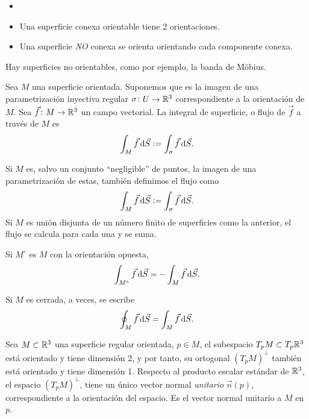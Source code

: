 \begin{obs}
    \begin{itemize}
        \item[]
        \item Una superficie conexa orientable tiene 2 orientaciones.
        \item Una superficie \emph{NO} conexa se orienta orientando cada componente conexa.
    \end{itemize}
\end{obs}
\begin{obs}
    Hay superficies no orientables, como por ejemplo, la banda de Möbius.
\end{obs}

\begin{defi}
    Sea $M$ una superficie orientada. Suponemos que es la imagen de una parametrización inyectiva regular $\sigma \colon U \to \mathbb{R}^3$
    correspondiente a la orientación de $M$. Sea $\vec{f} \colon M \to \mathbb{R}^3$ un campo vectorial. La integral de superficie, o flujo de $\vec{f}$
    a trav\'es de $M$ es
    \[
        \int_M \vec{f} \dif \vec{S} := \int_\sigma \vec{f} \dif \vec{S}.
    \]
\end{defi}

\begin{obs}
    Si $M$ es, salvo un conjunto ``negligible'' de puntos, la imagen de una parametrización de estas, tambi\'en definimos el flujo como
    \[
        \int_M \vec{f} \dif \vec{S} := \int_\sigma \vec{f} \dif \vec{S}.
    \]
    Si $M$ es unión disjunta de un número finito de superficies como la anterior, el flujo se calcula para cada una y se suma.
\end{obs}

\begin{obs}
    Si $M^\circ$ es $M$ con la orientación opuesta,
    \[
        \int_{M^\circ} \vec{f} \dif \vec{S} = - \int_M \vec{f} \dif \vec{S}.
    \]
\end{obs}

\begin{obs}
    Si $M$ es cerrada, a veces, se escribe
    \[
        \oint_M \vec{f} \dif \vec{S} = \int_M \vec{f} \dif \vec{S}.
    \]
\end{obs}

\begin{defi}
    Sea $M \subset \mathbb{R}^3$ una superficie regular orientada, $p \in M$, el subespacio $T_pM \subset T_p\mathbb{R}^3$ está orientado y tiene
    dimensión 2, y por tanto, su ortogonal $\left( T_pM \right)^\perp$ tambi\'en está orientado y tiene dimensión 1. Respecto al producto
    escalar estándar de $\mathbb{R}^3$, el espacio $\left( T_pM \right)^\perp$, tiene un único vector normal \emph{unitario} $\vec{n}(p)$, 
    correspondiente a la orientación del espacio. Es el vector normal unitario a $M$ en $p$.
\end{defi}


